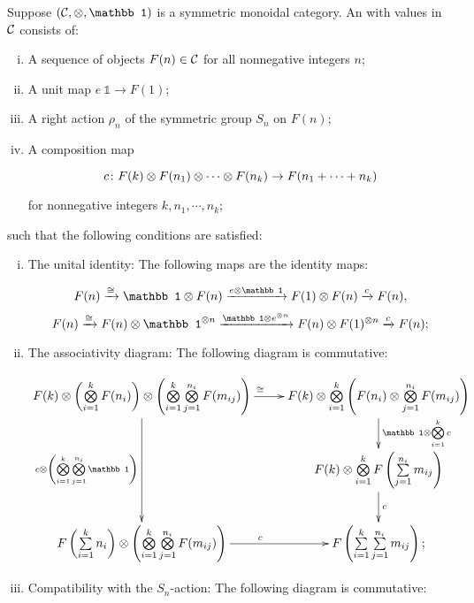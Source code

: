 \documentclass[twoside]{article}
\begin{document}
\begin{definition}
    Suppose $(\cal C,\ox,\mathbb1)$ is a symmetric monoidal category.
    An  with values in $\cal C$ consists of:
    \begin{enumerate}[i)]
        \item A sequence of objects $F(n)\in\cal C$ for all nonnegative integers $n$;
        \item A unit map $e\:\mathbb1\to F(1)$;
        \item A right action $\rho_n$ of the symmetric group $S_n$ on $F(n)$;
        \item A composition map 
        
        \[c\colon F(k)\otimes F(n_1)\otimes\cdots\otimes F(n_k)
        \to F(n_1+\cdots+n_k)\]
        
        for nonnegative integers $k,n_1,\cdots,n_k$;
    \end{enumerate}
    such that the following conditions are satisfied:
    \begin{enumerate}[i)]
        \item The unital identity: The following maps are the identity maps:
        
        \[F(n)\xrightarrow{\cong}\mathbb1\ox F(n)\xrightarrow{e\ox\mathbb1}
        F(1)\ox F(n)\xrightarrow{c}F(n),\]
        \[F(n)\xrightarrow{\cong}F(n)\ox\mathbb1^{\ox n}
        \xrightarrow{\mathbb1\ox e^{\ox n}}F(n)\ox F(1)^{\ox n}\xrightarrow{c}F(n);\]

        \item The associativity diagram: The following diagram is commutative:
        
        \begingroup
        \footnotesize
        \[\xymatrix{
        F(k)\ox\9\bigox_{i=1}^k F(n_i)\0\ox\9\bigox_{i=1}^k\bigox_{j=1}^{n_i}F(m_{ij})\0
        \ar[dd]_{c\ox\9\bigox_{i=1}^k\bigox_{j=1}^{n_i}\mathbb1\0}\ar[r]^\cong&
        F(k)\ox\bigox_{i=1}^k\9F(n_i)\ox\bigox_{j=1}^{n_i}F(m_{ij})\0
        \ar[d]^{\mathbb1\ox\bigox_{i=1}^kc}\\&
        F(k)\ox\bigox_{i=1}^kF\9\sum\limits_{j=1}^{n_i}m_{ij}\0\ar[d]^c\\
        F\9\sum\limits_{i=1}^kn_i\0\ox\9\bigox_{i=1}^k\bigox_{j=1}^{n_i}F(m_{ij})\0
        \ar[r]^c&F\9\sum\limits_{i=1}^k\sum\limits_{j=1}^{n_i}m_{ij}\0;}\]
        \endgroup

        \item Compatibility with the $S_n$-action: The following diagram
        is commutative: 
        

\end{enumerate}
\end{definition}
\end{document}
